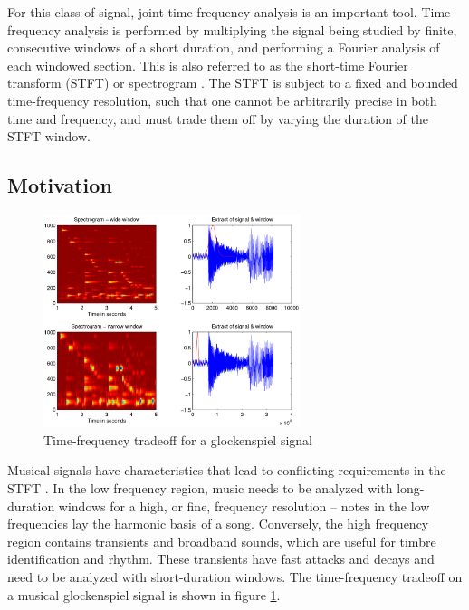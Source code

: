 \documentclass[letter,12pt,notitlepage]{article}
\begin{document}
For this class of signal, joint time-frequency analysis is an important tool. Time-frequency analysis is performed by multiplying the signal being studied by finite, consecutive windows of a short duration, and performing a Fourier analysis of each windowed section. This is also referred to as the short-time Fourier transform (STFT) or spectrogram . The STFT is subject to a fixed and bounded time-frequency resolution, such that one cannot be arbitrarily precise in both time and frequency, and must trade them off by varying the duration of the STFT window.

\subsection{Motivation}

\begin{figure}
	\vspace{-1.0em}
	\includegraphics[width=7.5cm]{./tf_tradeoff_dorfler.png}
	\caption{Time-frequency tradeoff for a glockenspiel signal}
	\label{fig:dorflertradeoff}
	\vspace{-1.5em}
\end{figure}

Musical signals have characteristics that lead to conflicting requirements in the STFT \cite{doerflerphd}. In the low frequency region, music needs to be analyzed with long-duration windows for a high, or fine, frequency resolution -- notes in the low frequencies lay the harmonic basis of a song. Conversely, the high frequency region contains transients and broadband sounds, which are useful for timbre identification and rhythm. These transients have fast attacks and decays and need to be analyzed with short-duration windows. The time-frequency tradeoff on a musical glockenspiel signal is shown in figure \ref{fig:dorflertradeoff}.
\end{document}
